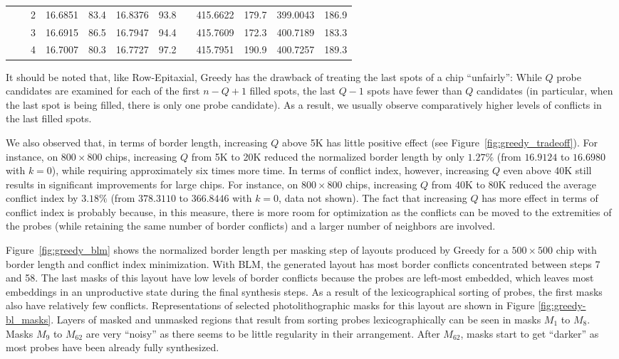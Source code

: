 \begin{table}[p!]
{\begin{tabular*}{\hsize}{crrd{4}rd{4}rld{4}rd{4}r}
        &     & 2 &      16.6851  & 83.4 &      16.8376  & 93.8 &  &      415.6622  & 179.7 &      399.0043  & 186.9 \\
        &     & 3 &      16.6915  & 86.5 &      16.7947  & 94.4 &  &      415.7609  & 172.3 &      400.7189  & 183.3 \\
        &     & 4 &      16.7007  & 80.3 &      16.7727  & 97.2 &  &      415.7951  & 190.9 &      400.7257  & 189.3 \\
\hline
\end{tabular*}}
\end{table}

It should be noted that, like Row-Epitaxial, Greedy has the drawback of treating
the last spots of a chip ``unfairly'': While $Q$ probe candidates are examined
for each of the first $n - Q + 1$ filled spots, the last $Q - 1$ spots have
fewer than $Q$ candidates (in particular, when the last spot is being filled,
there is only one probe candidate). As a result, we usually observe
comparatively higher levels of conflicts in the last filled spots.

We also observed that, in terms of border length, increasing $Q$ above 5K has
little positive effect (see Figure~\ref{fig:greedy_tradeoff}). For instance, on
$800\times 800$ chips, increasing $Q$ from 5K to 20K reduced the normalized
border length by only $1.27\%$ (from $16.9124$ to $16.6980$ with $k=0$), while
requiring approximately six times more time. In terms of conflict index,
however, increasing $Q$ even above 40K still results in significant improvements
for large chips. For instance, on $800\times 800$ chips, increasing $Q$ from 40K
to 80K reduced the average conflict index by $3.18\%$ (from $378.3110$ to
$366.8446$ with $k=0$, data not shown). The fact that increasing $Q$ has more
effect in terms of conflict index is probably because, in this measure, there is
more room for optimization as the conflicts can be moved to the extremities of
the probes (while retaining the same number of border conflicts) and a larger
number of neighbors are involved.

Figure~\ref{fig:greedy_blm} shows the normalized border length per masking step
of layouts produced by Greedy for a $500\times 500$ chip with border length and
conflict index minimization. With BLM, the generated layout has most border
conflicts concentrated between steps 7 and 58. The last masks of this layout
have low levels of border conflicts because the probes are left-most embedded,
which leaves most embeddings in an unproductive state during the final synthesis
steps. As a result of the lexicographical sorting of probes, the first masks
also have relatively few conflicts. Representations of selected
photolithographic masks for this layout are shown in Figure
\ref{fig:greedy-bl_masks}. Layers of masked and unmasked regions that result
from sorting probes lexicographically can be seen in masks $M_1$ to $M_8$.
Masks $M_9$ to $M_{62}$ are very ``noisy'' as there seems to be little
regularity in their arrangement. After $M_{62}$, masks start to get ``darker''
as most probes have been already fully synthesized.

